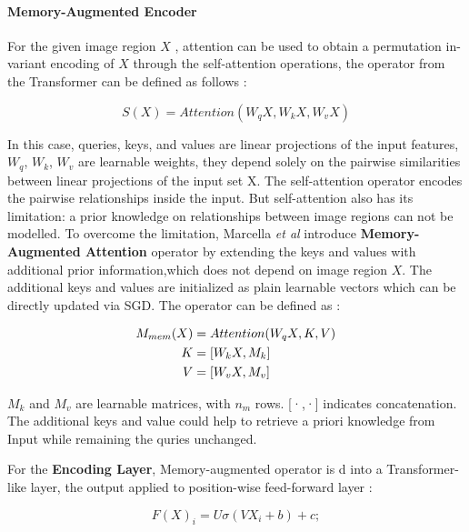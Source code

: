 \documentclass[
]{krantz}
\begin{document}
\hypertarget{memory-augmented-encoder}{%
\paragraph{Memory-Augmented Encoder}\label{memory-augmented-encoder}}

For the given image region \(X\) , attention can be used to obtain a permutation in- variant encoding of \(X\) through the self-attention operations, the operator from the Transformer can be defined as follows \citep{cornia2020m2}:

\begin{equation}
S(X) = Attention(W_q X, W_k X, W_vX)
\end{equation}

In this case, queries, keys, and values are linear projections of the input features,\(W_q\), \(W_k\), \(W_v\) are learnable weights, they depend solely on the pairwise similarities between linear projections of the input set X. The self-attention operator encodes the pairwise relationships inside the input.
But self-attention also has its limitation: a prior knowledge on relationships between image regions can not be modelled.
To overcome the limitation, Marcella \emph{et al}\citep{cornia2020m2} introduce \textbf{Memory-Augmented Attention} operator by extending the keys and values with additional prior information,which does not depend on image region \(X\).
The additional keys and values are initialized as plain learnable vectors which can be directly updated via SGD.
The operator can be defined as \citep{cornia2020m2}:

\begin{align}
M_{mem}(X) &=  Attention(W_qX, K, V ) \notag \\
K &=  [W_kX, M_k]\notag \\
V &= [W_vX, M_v]
\end{align}

\(M_k\) and \(M_v\) are learnable matrices, with \(n_m\) rows. {[}·,·{]} indicates concatenation. The additional keys and value could help to retrieve a priori knowledge from Input while remaining the quries unchanged.\citep{cornia2020m2}

For the \textbf{Encoding Layer}, Memory-augmented operator is d into a Transformer-like layer, the output applied to position-wise feed-forward layer \citep{cornia2020m2}:

\begin{equation}
F(X)_i= U\sigma(V X_i + b) + c;
\end{equation}
\end{document}
